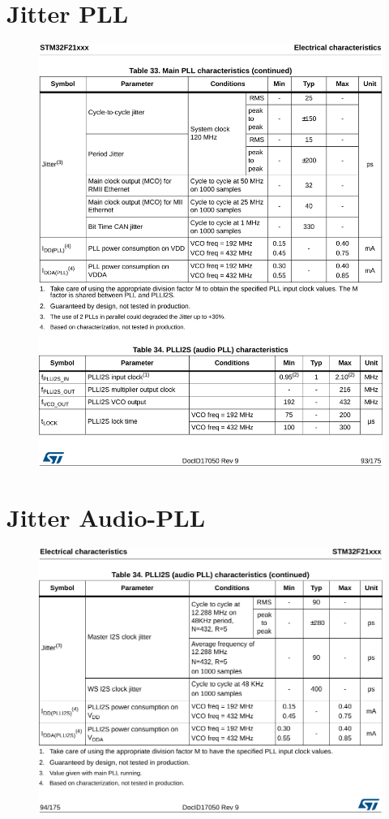 \begin{appendices}
	\section{Jitter PLL}
	\begin{figure}[h!]
		\centering
		\includegraphics[width=1\textwidth]{../fig/stm32f21xx-jitter-pll.pdf}
	\end{figure}
	
	\newpage
	\section{Jitter Audio-PLL}
	\begin{figure}[h!]
		\centering
		\includegraphics[width=1\textwidth]{../fig/stm32f21xx-jitter-audio-pll.pdf}
	\end{figure}
\end{appendices}
